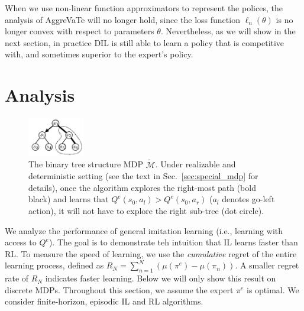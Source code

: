 \documentclass{article}
\begin{document}
When we use non-linear function approximators to represent the polices, the analysis of AggreVaTe  \cite{ross2014reinforcement} will no longer hold, since the loss function $\ell_n(\theta)$ is no longer convex with respect to parameters $\theta$. Nevertheless, as we will show in the next section, in practice DIL is still able to learn a policy that is competitive with, and sometimes superior to the expert's policy.  

\section{Analysis}
\begin{figure}
  \centering
      \includegraphics[trim={1cm 0.5cm 0 1cm},clip, width=0.22\textwidth]{./figure/binary_tree_MDP}
  \caption{The binary tree structure MDP $\tilde{\mathcal{M}}$. Under realizable and deterministic setting (see the text in Sec.~\ref{sec:special_mdp} for details), once the algorithm explores the right-most path (bold black) and learns that $Q^e(s_0, a_l)>Q^e(s_0,a_r)$ ($a_l$ denotes go-left action), it will not have to explore the right sub-tree (dot circle).}
  \label{fig:binary_MDP}
  \vspace{-5pt}
\end{figure}
We analyze the performance of general imitation learning (i.e., learning with access to $Q^e$). The goal is to demonstrate teh intuition that IL learns faster than RL. To measure the speed of learning, we use the \emph{cumulative} regret of the entire learning process, defined as $R_N = \sum_{n=1}^N (\mu(\pi^e) - \mu(\pi_n))$. A smaller regret rate of $R_N$ indicates faster learning. Below we will only show this result on discrete MDPs. Throughout this section, we assume the expert $\pi^e$ is optimal. We consider finite-horizon, episodic IL and RL algorithms. 
\end{document}
